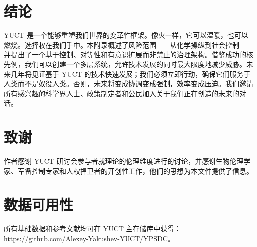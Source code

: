 \documentclass[12pt,a4paper]{article}
\theoremstyle{remark}
\begin{document}
	\section{结论}
	\label{sec:conclusion}
	
	YUCT 是一个能够重塑我们世界的变革性框架。像火一样，它可以温暖，也可以燃烧。选择权在我们手中。本附录概述了风险范围——从化学操纵到社会控制——并提出了一个基于控制、对等性和有意识扩展而非禁止的治理架构。借鉴成功的核先例，我们可以创建一个多层系统，允许技术发展的同时最大限度地减少威胁。未来几年将见证基于 YUCT 的技术快速发展；我们必须立即行动，确保它们服务于人类而不是奴役人类。否则，未来将变成协调变成强制，效率变成压迫。我们邀请所有感兴趣的科学界人士、政策制定者和公民加入关于我们正在创造的未来的对话。
	
	\section*{致谢}
	
	作者感谢 YUCT 研讨会参与者就理论的伦理维度进行的讨论，并感谢生物伦理学家、军备控制专家和人权捍卫者的开创性工作，他们的思想为本文件提供了信息。
	
	\section*{数据可用性}
	
	所有基础数据和参考文献均可在 YUCT 主存储库中获得：\url{https://github.com/Alexey-Yakushev-YUCT/YPSDC}。
	
\end{document}

